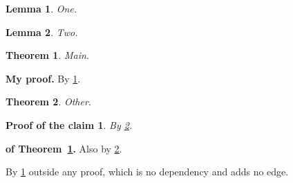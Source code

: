 \documentclass{article}
\newenvironment{myproof}[1][My proof]{\par\noindent\textbf{#1.} }{\par}
\newtheorem{theorem}{Theorem}
\newtheorem{lemma}{Lemma}
\newtheorem{claimproof}{Proof of the claim}
\begin{document}
\begin{lemma}\label{l1}One.\end{lemma}
\begin{lemma}\label{l2}Two.\end{lemma}

\begin{theorem}\label{t1}Main.\end{theorem}
\begin{myproof}By \ref{l1}.\end{myproof}          %

\begin{theorem}\label{t2}Other.\end{theorem}
\begin{claimproof}By \ref{l2}.\end{claimproof}    %

\begin{myproof}[of Theorem~\ref{t1}]              %
  Also by \ref{l2}.
\end{myproof}

By \ref{l1} outside any proof, which is no dependency and adds no edge.
\end{document}
